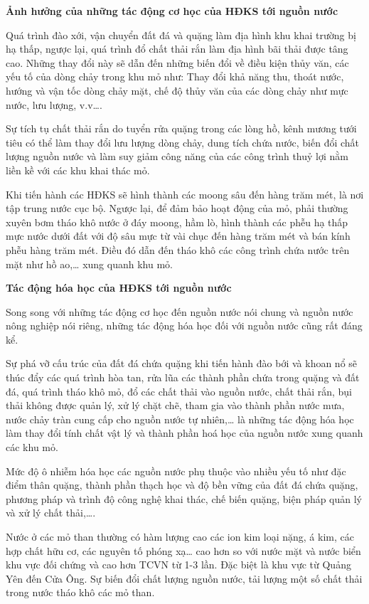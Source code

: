 \begin{enumerate}[label=\bfseries Câu \arabic*:]
{		\textbf{Ảnh hưởng của những tác động cơ học của HĐKS tới nguồn nước}
		
		Quá trình đào xới, vận chuyển đất đá và quặng làm địa hình khu khai trường bị hạ thấp, ngược lại, quá trình đổ chất thải rắn làm địa hình bãi thải được tâng cao. Những thay đổi này sẽ dẫn đến những biến đổi về điều kiện thủy văn, các yếu tố của dòng chảy trong khu mỏ như: Thay đổi khả năng thu, thoát nước, hướng và vận tốc dòng chảy mặt, chế độ thủy văn của các dòng chảy như mực nước, lưu lượng, v.v….
		
		Sự tích tụ chất thải rắn do tuyển rửa quặng trong các lòng hồ, kênh mương tưới tiêu có thể làm thay đổi lưu lượng dòng chảy, dung tích chứa nước, biến đổi chất lượng nguồn nước và làm suy giảm công năng của các công trình thuỷ lợi nằm liền kề với các khu khai thác mỏ.
		
		Khi tiến hành các HĐKS sẽ hình thành các moong sâu đến hàng trăm mét, là nơi tập trung nước cục bộ. Ngược lại, để đảm bảo hoạt động của mỏ, phải thường xuyên bơm tháo khô nước ở đáy moong, hầm lò, hình thành các phễu hạ thấp mực nước dưới đất với độ sâu mực từ vài chục đến hàng trăm mét và bán kính phễu hàng trăm mét. Điều đó dẫn đến tháo khô các công trình chứa nước trên mặt như hồ ao,… xung quanh khu mỏ.
		
		\textbf{Tác động hóa học của HĐKS tới nguồn nước}
		
		Song song với những tác động cơ học đến nguồn nước nói chung và nguồn nước nông nghiệp nói riêng, những tác động hóa học đối với nguồn nước cũng rất đáng kể.
		
		Sự phá vỡ cấu trúc của đất đá chứa quặng khi tiến hành đào bới và khoan nổ sẽ thúc đẩy các quá trình hòa tan, rửa lũa các thành phần chứa trong quặng và đất đá, quá trình tháo khô mỏ, đổ các chất thải vào nguồn nước, chất thải rắn, bụi thải không được quản lý, xử lý chặt chẽ, tham gia vào thành phần nước mưa, nước chảy tràn cung cấp cho nguồn nước tự nhiên,… là những tác động hóa học làm thay đổi tính chất vật lý và thành phần hoá học của nguồn nước xung quanh các khu mỏ.
		
		Mức độ ô nhiễm hóa học các nguồn nước phụ thuộc vào nhiều yếu tố như đặc điểm thân quặng, thành phần thạch học và độ bền vững của đất đá chứa quặng, phương pháp và trình độ công nghệ khai thác, chế biến quặng, biện pháp quản lý và xử lý chất thải,….
		
		Nước ở các mỏ than thường có hàm lượng cao các ion kim loại nặng, á kim, các hợp chất hữu cơ, các nguyên tố phóng xạ… cao hơn so với nước mặt và nước biển khu vực đối chứng và cao hơn TCVN từ 1-3 lần. Đặc biệt là khu vực từ Quảng Yên đến Cửa Ông. Sự biến đổi chất lượng nguồn nước, tải lượng một số chất thải trong nước tháo khô các mỏ than.
		
}
\end{enumerate}
